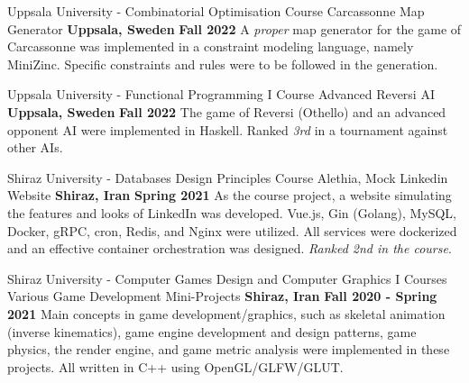 \begin{cventries}
  \cventry
    {Uppsala University - Combinatorial Optimisation Course} %
    {Carcassonne Map Generator} %
    {\textbf{Uppsala, Sweden}} %
    {\textbf{Fall 2022}} %
    {
        A \emph{proper} map generator for the game of Carcassonne was implemented in a constraint modeling language, namely MiniZinc. Specific constraints and rules were to be followed in the generation.
    }
    
  \cventry
    {Uppsala University - Functional Programming I Course} %
    {Advanced Reversi AI} %
    {\textbf{Uppsala, Sweden}} %
    {\textbf{Fall 2022}} %
    {
        The game of Reversi (Othello) and an advanced opponent AI were implemented in Haskell. Ranked \emph{3rd} in a tournament against other AIs.
    }


    
  \cventry
    {Shiraz University - Databases Design Principles Course} %
    {Alethia, Mock Linkedin Website} %
    {\textbf{Shiraz, Iran}} %
    {\textbf{Spring 2021}} %
    {
      As the course project, a website simulating the features and looks of LinkedIn was developed. Vue.js, Gin (Golang), MySQL, Docker, gRPC, cron, Redis, and Nginx were utilized. All services were dockerized and an effective container orchestration was designed. \emph{Ranked 2nd in the course}.
    }

  \cventry
    {Shiraz University - Computer Games Design and Computer Graphics I Courses} %
    {Various Game Development Mini-Projects} %
    {\textbf{Shiraz, Iran}} %
    {\textbf{Fall 2020 - Spring 2021}} %
    {
      Main concepts in game development/graphics, such as skeletal animation (inverse kinematics), game engine development and design patterns, game physics, the render engine, and game metric analysis were implemented in these projects. All written in C++ using OpenGL/GLFW/GLUT.
    }


\end{cventries}

